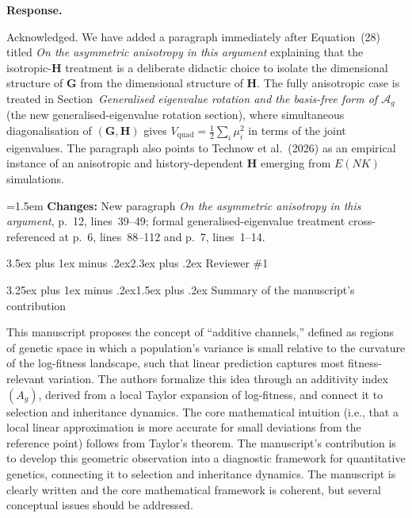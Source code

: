 \documentclass[11pt,a4paper]{article}
\makeatletter
\newcommand{\response}{%
  \par\medskip\noindent\textbf{\color{ResponseColor}Response.}\quad\ignorespaces
}
\newcommand{\changesat}[1]{%
  \par\smallskip\noindent\hangindent=1.5em\hangafter=1
  \textbf{\color{ChangeColor}Changes:} \quad #1\par\medskip
}
\renewcommand{\section}{\@startsection{section}{1}{0pt}%
  {3.5ex plus 1ex minus .2ex}{2.3ex plus .2ex}%
  {\Large\bfseries\color{ReviewerColor}}}
\renewcommand{\subsection}{\@startsection{subsection}{2}{0pt}%
  {3.25ex plus 1ex minus .2ex}{1.5ex plus .2ex}%
  {\large\bfseries}}
\newcommand{\Ag}{\ensuremath{\mathcal{A}_{g}}\xspace}
\newcommand{\Vquad}{\ensuremath{V_{\mathrm{quad}}}\xspace}
\newcommand{\mat}[1]{\ensuremath{\mathbf{#1}}}
\makeatother
\begin{document}
\response
Acknowledged. We have added a paragraph immediately after Equation~(28) titled \textit{On the asymmetric anisotropy in this argument} explaining that the isotropic-$\mat{H}$ treatment is a deliberate didactic choice to isolate the dimensional structure of $\mat{G}$ from the dimensional structure of $\mat{H}$. The fully anisotropic case is treated in Section~\textit{Generalised eigenvalue rotation and the basis-free form of \Ag} (the new generalised-eigenvalue rotation section), where simultaneous diagonalisation of $(\mat{G}, \mat{H})$ gives $\Vquad = \tfrac{1}{2}\sum_i \mu_i^2$ in terms of the joint eigenvalues. The paragraph also points to Technow et al.\ (2026) as an empirical instance of an anisotropic and history-dependent $\mat{H}$ emerging from $E(NK)$ simulations.

\changesat{New paragraph \textit{On the asymmetric anisotropy in this argument}, p.~12, lines~39--49; formal generalised-eigenvalue treatment cross-referenced at p.~6, lines~88--112 and p.~7, lines~1--14.}

\newpage


\section{Reviewer \#1}

\subsection{Summary of the manuscript's contribution}

\begin{revquote}
This manuscript proposes the concept of ``additive channels,'' defined as regions of genetic space in which a population's variance is small relative to the curvature of the log-fitness landscape, such that linear prediction captures most fitness-relevant variation. The authors formalize this idea through an additivity index $(A_g)$, derived from a local Taylor expansion of log-fitness, and connect it to selection and inheritance dynamics. The core mathematical intuition (i.e., that a local linear approximation is more accurate for small deviations from the reference point) follows from Taylor's theorem. The manuscript's contribution is to develop this geometric observation into a diagnostic framework for quantitative genetics, connecting it to selection and inheritance dynamics. The manuscript is clearly written and the core mathematical framework is coherent, but several conceptual issues should be addressed.
\end{revquote}
\end{document}
